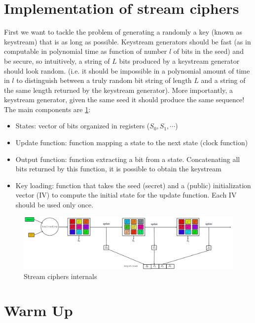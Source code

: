 \section{Implementation of stream ciphers}

First we want to tackle the problem of generating a randomly a key (known as keystream) that is as long as possible. Keystream generators should be fast (as in computable in polynomial time as function of number $l$ of bits in the seed) and be secure, so intuitively, a string of $L$ bits produced by a keystream generator should look random. (i.e. it should be impossible in a polynomial amount of time in $l$ to distinguish between a truly random bit string of length $L$ and a string of the same length returned by the keystream generator). More importantly, a keystream generator, given the same seed it should produce the same sequence! The main components are \ref{fig:lfsr_internals}:
\begin{itemize}
	\item States: vector of bits organized in registers ($S_0,S_1,\cdots$)
	\item Update function: function mapping a state to the next state (clock function)
	\item Output function: function extracting a bit from a state. Concatenating all bits returned by this function, it is possible to obtain the keystream
	\item Key loading: function that takes the seed (secret) and a (public) initialization vector (IV) to compute the initial state for the update function. Each IV should be used only once.
\end{itemize}

\begin{figure}
	\centering
	\includegraphics[width=0.9\linewidth]{Images/Chapter2/lfsr_internals}
	\caption{Stream ciphers internals}
	\label{fig:lfsr_internals}
\end{figure}

\section{Warm Up}

